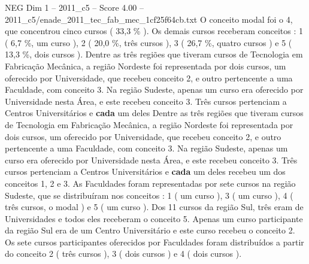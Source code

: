 \begin{textsample}{NEG Dim 1 – 2011\_c5 – Score 4.00 – 2011\_c5/enade\_2011\_tec\_fab\_mec\_1cf25f64cb.txt}
O conceito modal foi o 4, que concentrou cinco cursos ( 33,3 \% ).
Os demais cursos receberam conceitos : 1 ( 6,7 \%, um curso ), 2 ( 20,0 \%, três cursos ), 3 ( 26,7 \%, quatro cursos ) e 5 ( 13,3 \%, dois cursos ).
Dentre as três regiões que tiveram cursos de Tecnologia em Fabricação Mecânica, a região Nordeste foi representada por dois cursos, um oferecido por Universidade, que recebeu conceito 2, e outro pertencente a uma Faculdade, com conceito 3.
Na região Sudeste, apenas um curso era oferecido por Universidade nesta Área, e este recebeu conceito 3.
Três cursos pertenciam a Centros Universitários e \textbf{cada} um deles Dentre as três regiões que tiveram cursos de Tecnologia em Fabricação Mecânica, a região Nordeste foi representada por dois cursos, um oferecido por Universidade, que recebeu conceito 2, e outro pertencente a uma Faculdade, com conceito 3.
Na região Sudeste, apenas um curso era oferecido por Universidade nesta Área, e este recebeu conceito 3.
Três cursos pertenciam a Centros Universitários e \textbf{cada} um deles recebeu um dos conceitos 1, 2 e 3.
As Faculdades foram representadas por sete cursos na região Sudeste, que se distribuíram nos conceitos : 1 ( um curso ), 3 ( um curso ), 4 ( três cursos, o modal ) e 5 ( um curso ).
Dos 11 cursos da região Sul, três eram de Universidades e todos eles receberam o conceito 5.
Apenas um curso participante da região Sul era de um Centro Universitário e este curso recebeu o conceito 2.
Os sete cursos participantes oferecidos por Faculdades foram distribuídos a partir do conceito 2 ( três cursos ), 3 ( dois cursos ) e 4 ( dois cursos ).

\end{textsample}
